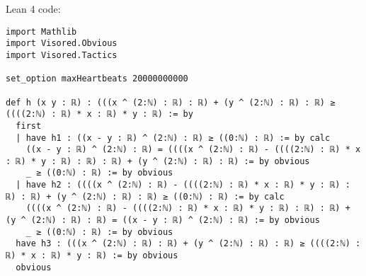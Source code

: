 \documentclass{article}
\begin{document}
Lean 4 code:
\begin{tcolorbox}[colback=white!10, width=\linewidth]
\begin{lstlisting}[language=Lean4]
import Mathlib
import Visored.Obvious
import Visored.Tactics

set_option maxHeartbeats 20000000000

def h (x y : ℝ) : (((x ^ (2:ℕ) : ℝ) : ℝ) + (y ^ (2:ℕ) : ℝ) : ℝ) ≥ ((((2:ℕ) : ℝ) * x : ℝ) * y : ℝ) := by
  first
  | have h1 : ((x - y : ℝ) ^ (2:ℕ) : ℝ) ≥ ((0:ℕ) : ℝ) := by calc
    ((x - y : ℝ) ^ (2:ℕ) : ℝ) = ((((x ^ (2:ℕ) : ℝ) - ((((2:ℕ) : ℝ) * x : ℝ) * y : ℝ) : ℝ) : ℝ) + (y ^ (2:ℕ) : ℝ) : ℝ) := by obvious
    _ ≥ ((0:ℕ) : ℝ) := by obvious
  | have h2 : ((((x ^ (2:ℕ) : ℝ) - ((((2:ℕ) : ℝ) * x : ℝ) * y : ℝ) : ℝ) : ℝ) + (y ^ (2:ℕ) : ℝ) : ℝ) ≥ ((0:ℕ) : ℝ) := by calc
    ((((x ^ (2:ℕ) : ℝ) - ((((2:ℕ) : ℝ) * x : ℝ) * y : ℝ) : ℝ) : ℝ) + (y ^ (2:ℕ) : ℝ) : ℝ) = ((x - y : ℝ) ^ (2:ℕ) : ℝ) := by obvious
    _ ≥ ((0:ℕ) : ℝ) := by obvious
  have h3 : (((x ^ (2:ℕ) : ℝ) : ℝ) + (y ^ (2:ℕ) : ℝ) : ℝ) ≥ ((((2:ℕ) : ℝ) * x : ℝ) * y : ℝ) := by obvious
  obvious

\end{lstlisting}
\end{tcolorbox}
\end{document}
